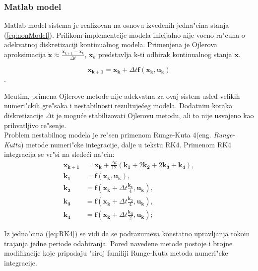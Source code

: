 \documentclass[a4paper,11pt]{article}
\theoremstyle{definition} \newtheorem{deff}{Definicija}[section]
\theoremstyle{definition} \newtheorem{prim}[deff]{Primer}
\theoremstyle{plain} \newtheorem{teor}[deff]{Teorema}
\newcommand{\vect}[1]{\boldsymbol{\mathbf{#1}}}
\begin{document}
	
	
	\clearpage
	
	\subsubsection{Matlab model}
	
	Matlab model sistema je realizovan na osnovu izvedenih jedna"cina stanja (\ref{eq:nonModel}). Prilikom implementcije modela inicijalno nije vo\dj eno ra"cuna o adekvatnoj diskretizaciji kontinualnog modela. Primenjena je Ojlerova aproksimacija $\dot{\mathbf{x}} \approx \frac{\mathbf{x}_{k+1} - \mathbf{x}_{k}}{\Delta t}$, $\mathbf{x}_{k}$ predstavlja k-ti odbirak kontinualnog stanja $\mathbf{x}$.
	
	\begin{equation} \label{eq:Ojler}
		\vect{x_{k+1}} = \vect{x_{k}} + \Delta t \vect{f}(\vect{x_k}, \vect{u_k})
	\end{equation}.
	
	Me\dj utim, primena Ojlerove metode nije adekvatna za ovaj sistem usled velikih numeri"ckih gre"saka i nestabilnosti rezultuje\'ceg modela. Dodatnim koraka diskretizacije $\Delta t$ je mogu\'ce stabilizovati Ojlerovu metodu, ali to nije usvojeno kao prihvatljivo re"senje.\\
	
	Problem nestabilnog modela je re"sen primenom Runge-Kuta 4(eng. \textit{Runge-Kutta}) metode numeri"cke integracije, dalje u tekstu RK4. Primenom RK4 integracija se vr"si na slede\'ci na"cin: 
	\begin{align} \label{eq:RK4}
		\vect{x_{k+1}} &= \vect{x_k} + \frac{\Delta t}{12}(\vect{k_1} + 2\vect{k_2}
			+ 2\vect{k_3} + \vect{k_4}), \\			
		\vect{k_1} &= \vect{f}(\vect{x_k}, \vect{u_k}), \\
		\vect{k_2} &= \vect{f}(\vect{x_k} + \Delta t \frac{\vect{k_1}}{4}, \vect{u_k}), \\
		\vect{k_3} &= \vect{f}(\vect{x_k} + \Delta t \frac{\vect{k_2}}{4}, \vect{u_k}), \\
		\vect{k_4} &= \vect{f}(\vect{x_k} +  \Delta t \frac{\vect{k_3}}{2}, \vect{u_k});		
	\end{align}
	
	Iz jedna"cina (\ref{eq:RK4}) se vidi da se podrazumeva konstatno upravljanja tokom trajanja jedne periode odabiranja. Pored navedene metode postoje i brojne modifikacije koje pripadaju "siroj familiji Runge-Kuta metoda numeri"cke integracije. \\
	
\end{document}
